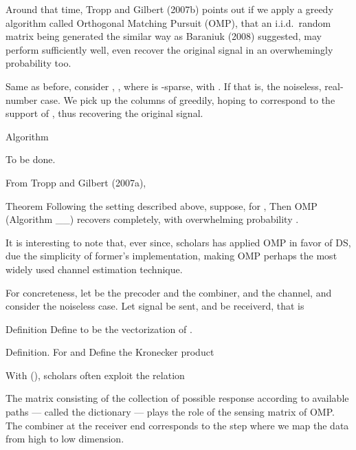 \stopsection
\startsection [title={Orthogonal Matching Pursuit}]

Around that time, Tropp and Gilbert (2007b) points out if we apply a greedy algorithm called Orthogonal Matching Pursuit (OMP), that an i.i.d.\ random matrix being generated the similar way as Baraniuk (2008) suggested, may perform sufficiently well, even recover the original signal in an overwhemingly probability too.

Same as before, consider , , where  is -sparse, with .
If
that is, the noiseless, real-number case.
We pick up the columns of  greedily, hoping to correspond to the support of , thus recovering the original signal.

\Result
{Algorithm}
{
\startitemize[n]
\item To be done.
\stopitemize
}

From Tropp and Gilbert (2007a),

\Result
{Theorem}
{
Following the setting described above, suppose, for ,
%
%
Then OMP (Algorithm \_\_) recovers  completely, with overwhelming probability .
}

It is interesting to note that, ever since, scholars has applied OMP in favor of DS, due the simplicity of former's implementation, making OMP perhaps the most widely used channel estimation technique.

For concreteness, let  be the precoder and  the combiner, and  the channel, and consider the noiseless case.
Let signal  be sent, and  be receiverd, that is
%
%

\Result
{Definition}
{
Define  to be the vectorization of .
}

\Result
{Definition.}
{
For  and 
Define the Kronecker product  
}

With (), scholars often exploit the relation
%
%

The matrix consisting of the collection of possible response according to available paths --- called the dictionary --- plays the role of the sensing matrix of OMP.
The combiner at the receiver end corresponds to the step where we map the data from high to low dimension.

